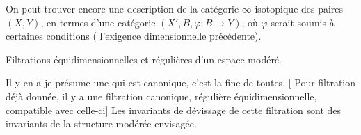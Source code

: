 
On peut  trouver encore une
description de la catégorie $\infty$-isotopique
des paires  $(X,Y)$, en termes
d'une catégorie $(X',B,\varphi:B\longrightarrow Y)$, où
$\varphi$ serait soumis à certaines conditions
(  l'exigence dimensionnelle
précédente).


Filtrations équidimensionnelles et
régulières d'un espace modéré.

Il y en a je présume une qui
est canonique, c'est la  fine
de toutes. [ Pour  filtration
déjà donnée, il y a une filtration
 canonique, régulière
équidimensionnelle, compatible
avec celle-ci] Les invariants de
dévissage de cette filtration sont 
des invariants de la structure
modérée envisagée.

